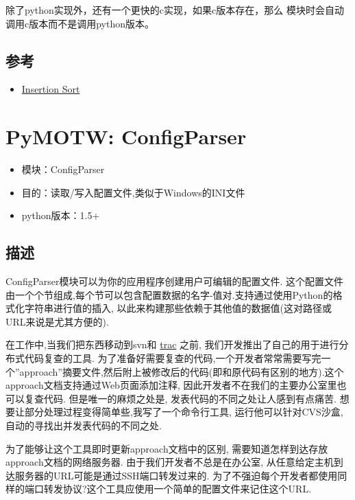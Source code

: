 \documentclass[letterpaper,10pt,english]{manual}
\begin{document}
除了python实现外，还有一个更快的c实现，如果c版本存在，那么  模块时会自动调用c版本而不是调用python版本。


\subsection{参考}
\begin{itemize}
\item {} 
\href{http://en.wikipedia.org/wiki/Insertion\_sort}{Insertion Sort}

\end{itemize}

\resetcurrentobjects


\section{PyMOTW: ConfigParser}
\begin{itemize}
\item {} 
模块：ConfigParser

\item {} 
目的：读取/写入配置文件,类似于Windows的INI文件

\item {} 
python版本：1.5+

\end{itemize}


\subsection{描述}

ConfigParser模块可以为你的应用程序创建用户可编辑的配置文件. 这个配置文件由一个个节组成,每个节可以包含配置数据的名字-值对.支持通过使用Python的格式化字符串进行值的插入, 以此来构建那些依赖于其他值的数据值(这对路径或URL来说是尤其方便的).

在工作中,当我们把东西移动到svn和 \href{http://trac.edgewall.org/}{trac} 之前, 我们开发推出了自己的用于进行分布式代码复查的工具. 为了准备好需要复查的代码,一个开发者常常需要写完一个''approach''摘要文件,然后附上被修改后的代码(即和原代码有区别的地方).这个 approach文档支持通过Web页面添加注释, 因此开发者不在我们的主要办公室里也可以复查代码. 但是唯一的麻烦之处是, 发表代码的不同之处让人感到有点痛苦. 想要让部分处理过程变得简单些,我写了一个命令行工具, 运行他可以针对CVS沙盒,自动的寻找出并发表代码的不同之处.

为了能够让这个工具即时更新approach文档中的区别, 需要知道怎样到达存放approach文档的网络服务器. 由于我们开发者不总是在办公室, 从任意给定主机到达服务器的URL可能是通过SSH端口转发过来的. 为了不强迫每个开发者都使用同样的端口转发协议?这个工具应使用一个简单的配置文件来记住这个URL.
\end{document}
